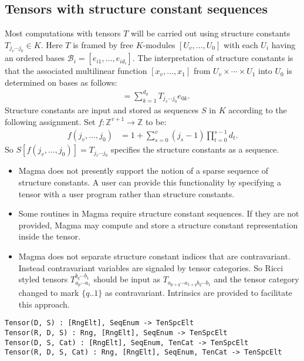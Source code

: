 \subsection{Tensors with structure constant sequences}
Most computations with tensors $T$ will be carried out using structure constants
$T_{j_v\cdots j_0}\in K$.  Here $T$ is framed by free $K$-modules $[U_v,\dots,U_0]$ 
with each $U_i$ having an ordered bases $\mathcal{B}_i=[e_{i1},\dots,e_{id_i}]$.
The interpretation of structure constants is that the associated multilinear function 
$[x_v,\dots,x_1]$ from $U_v\times \cdots \times U_1$ into $U_0$ is determined on 
bases as follows:
\begin{align*}
	[e_{vj_v},\dots,e_{1j_1} ]& = \sum_{k=1}^{d_0} T_{j_v \cdots j_0} e_{0k}.
\end{align*}
Structure constants are input and stored as sequences $S$ in $K$ according to the
following assignment. Set $f:\mathbb{Z}^{v+1}\to \mathbb{Z}$ to be:
\begin{align*}
		 f(j_v,\dots,j_0) & = 1+\sum_{s=0}^v (j_s-1)\prod_{t=0}^{s-1} d_t.
\end{align*}
So $S[f(j_v,\dots,j_0)]=T_{j_v\cdots j_0}$ specifies the structure constants as a sequence.  
\smallskip

\begin{itemize}
\item Magma does not presently support the notion of a sparse sequence of structure constants.
A user can provide this functionality by specifying a tensor with a user program rather
than structure constants. 

\item Some routines in Magma require structure constant sequences.  If they 
are not provided, Magma may compute and store a structure constant representation
inside the tensor.

\item Magma does not separate structure constant indices that are contravariant.  Instead contravariant variables are signaled by tensor categories.  So Ricci styled tensors $T_{a_p\cdots a_1}^{b_q\cdots b_1}$ should be input as $T_{a_{p+q}\cdots a_{1+q} b_q\cdots b_1}$ and the tensor
category changed to mark $\{q..1\}$ as contravariant. Intrinsics are provided to facilitate this approach.
\end{itemize}
\medskip

\color{blue}
{\small \begin{verbatim}
Tensor(D, S) : [RngElt], SeqEnum -> TenSpcElt
Tensor(R, D, S) : Rng, [RngElt], SeqEnum -> TenSpcElt
Tensor(D, S, Cat) : [RngElt], SeqEnum, TenCat -> TenSpcElt
Tensor(R, D, S, Cat) : Rng, [RngElt], SeqEnum, TenCat -> TenSpcElt
\end{verbatim} }
\color{black}

